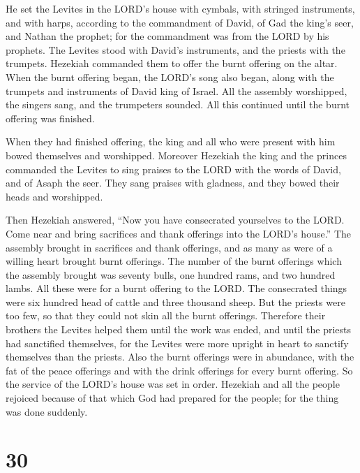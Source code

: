  He set the Levites in the LORD's house with cymbals,
with stringed instruments, and with harps, according to the commandment
of David, of Gad the king's seer, and Nathan the prophet; for the
commandment was from the LORD by his prophets.  The
Levites stood with David's instruments, and the priests with the
trumpets.  Hezekiah commanded them to offer the burnt
offering on the altar. When the burnt offering began, the LORD's song
also began, along with the trumpets and instruments of David king of
Israel.  All the assembly worshipped, the singers sang,
and the trumpeters sounded. All this continued until the burnt offering
was finished.

 When they had finished offering, the king and all who
were present with him bowed themselves and worshipped. 
Moreover Hezekiah the king and the princes commanded the Levites to sing
praises to the LORD with the words of David, and of Asaph the seer. They
sang praises with gladness, and they bowed their heads and worshipped.

 Then Hezekiah answered, ``Now you have consecrated
yourselves to the LORD. Come near and bring sacrifices and thank
offerings into the LORD's house.'' The assembly brought in sacrifices
and thank offerings, and as many as were of a willing heart brought
burnt offerings.  The number of the burnt offerings which
the assembly brought was seventy bulls, one hundred rams, and two
hundred lambs. All these were for a burnt offering to the LORD.
 The consecrated things were six hundred head of cattle
and three thousand sheep.  But the priests were too few,
so that they could not skin all the burnt offerings. Therefore their
brothers the Levites helped them until the work was ended, and until the
priests had sanctified themselves, for the Levites were more upright in
heart to sanctify themselves than the priests.  Also the
burnt offerings were in abundance, with the fat of the peace offerings
and with the drink offerings for every burnt offering. So the service of
the LORD's house was set in order.  Hezekiah and all the
people rejoiced because of that which God had prepared for the people;
for the thing was done suddenly.

\hypertarget{section-29}{%
\section{30}\label{section-29}}

